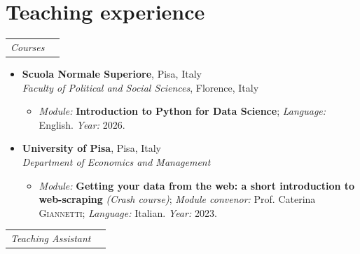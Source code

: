 \documentclass{article}
\begin{document}
\section*{Teaching experience}
\begin{tabular}{l l}
{\Large \emph{Courses}}&

\end{tabular}
\begin{itemize}
    \item \textbf{Scuola Normale Superiore}, Pisa, Italy\\
		\textit{Faculty of Political and Social Sciences}, Florence, Italy
	    \begin{itemize}
	        \item \emph{Module:} \textbf{Introduction to Python for Data Science}; \emph{Language:} English. \emph{Year:} 2026.
	    \end{itemize}

    \item \textbf{University of Pisa}, Pisa, Italy\\ 
		\textit{Department of Economics and Management}
	    \begin{itemize}
	        \item \emph{Module:} \textbf{Getting your data from the web: a short introduction to web-scraping} \emph{(Crash course)}; \emph{Module convenor:} Prof. Caterina \textsc{Giannetti}; \emph{Language:} Italian. \emph{Year:} 2023.
	    \end{itemize}
    
\end{itemize}
\begin{tabular}{l l}

{\Large\emph{Teaching Assistant}}&
\end{tabular}
\end{document}
